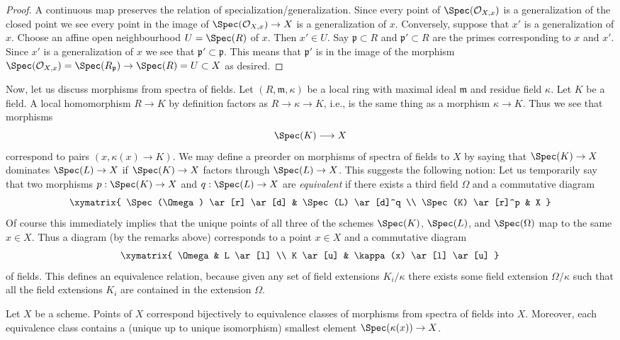\begin{proof}
A continuous map preserves the relation of specialization/generalization.
Since every point of $\Spec(\mathcal{O}_{X, x})$ is a
generalization of the closed point we see every point in the image
of $\Spec(\mathcal{O}_{X, x}) \to X$ is a generalization of $x$.
Conversely, suppose that $x'$ is a generalization of $x$.
Choose an affine open neighbourhood $U = \Spec(R)$ of
$x$. Then $x' \in U$. Say $\mathfrak p \subset R$ and
$\mathfrak p' \subset R$ are the primes corresponding
to $x$ and $x'$. Since $x'$ is a generalization of $x$
we see that $\mathfrak p' \subset \mathfrak p$. This means
that $\mathfrak p'$ is in the image of the morphism
$\Spec(\mathcal{O}_{X, x}) = \Spec(R_{\mathfrak p})
\to \Spec(R) = U \subset X$ as desired.
\end{proof}

\noindent
Now, let us discuss morphisms from spectra of fields.
Let $(R, \mathfrak m, \kappa)$ be a local ring
with maximal ideal $\mathfrak m$ and residue field $\kappa$.
Let $K$ be a field. A local homomorphism $R \to K$ by definition
factors as $R \to \kappa \to K$, i.e., is the same thing as
a morphism $\kappa \to K$. Thus we see that morphisms
$$
\Spec(K) \longrightarrow X
$$
correspond to pairs $(x, \kappa(x) \to K)$. We may define
a preorder on morphisms of spectra of fields to $X$
by saying that $\Spec(K) \to X$ dominates
$\Spec(L) \to X$ if $\Spec(K) \to X$
factors through $\Spec(L) \to X$. This suggests
the following notion: Let us temporarily
say that two morphisms $p : \Spec(K) \to X$ and
$q : \Spec(L) \to X$ are {\it equivalent} if there exists
a third field $\Omega$ and a commutative diagram
$$
\xymatrix{
\Spec(\Omega) \ar[r] \ar[d] &
\Spec(L) \ar[d]^q \\
\Spec(K) \ar[r]^p &
X
}
$$
Of course this immediately implies that the unique points of
all three of the schemes $\Spec(K)$,
$\Spec(L)$, and $\Spec(\Omega)$
map to the same $x \in X$. Thus a diagram (by the remarks above)
corresponds to a point $x \in X$ and a commutative diagram
$$
\xymatrix{
\Omega &
L \ar[l] \\
K \ar[u] &
\kappa(x) \ar[l] \ar[u]
}
$$
of fields. This defines an equivalence relation, because given
any set of field extensions $K_i/\kappa$ there exists
some field extension $\Omega/\kappa$ such that all
the field extensions $K_i$ are contained in the extension $\Omega$.

\begin{lemma}
\label{lemma-characterize-points}
Let $X$ be a scheme. Points of $X$ correspond bijectively
to equivalence classes of morphisms from spectra of
fields into $X$. Moreover, each equivalence class contains
a (unique up to unique isomorphism) smallest element
$\Spec(\kappa(x)) \to X$.
\end{lemma}

